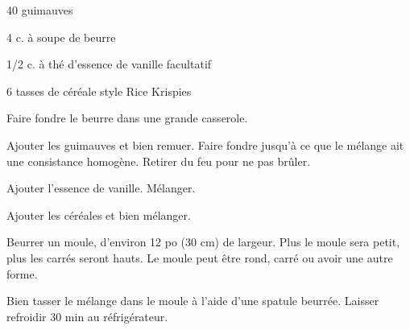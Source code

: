



\totaltime{}


\begin{ingredients}
    \item 40 guimauves
    \item 4 c. à soupe de beurre
    \item 1/2 c. à thé d'essence de vanille facultatif
    \item 6 tasses de céréale style Rice Krispies
\end{ingredients}

\begin{steps}
    \item Faire fondre le beurre dans une grande casserole.
    \item Ajouter les guimauves et bien remuer. Faire fondre jusqu'à ce que le mélange ait une consistance homogène. Retirer du feu pour ne pas brûler.
    \item Ajouter l'essence de vanille. Mélanger.
    \item Ajouter les céréales et bien mélanger.
    \item Beurrer un moule, d'environ 12 po (30 cm) de largeur. Plus le moule sera petit, plus les carrés seront hauts. Le moule peut être rond, carré ou avoir une autre forme.
    \item Bien tasser le mélange dans le moule à l'aide d'une spatule beurrée. Laisser refroidir 30 min au réfrigérateur.
\end{steps}
